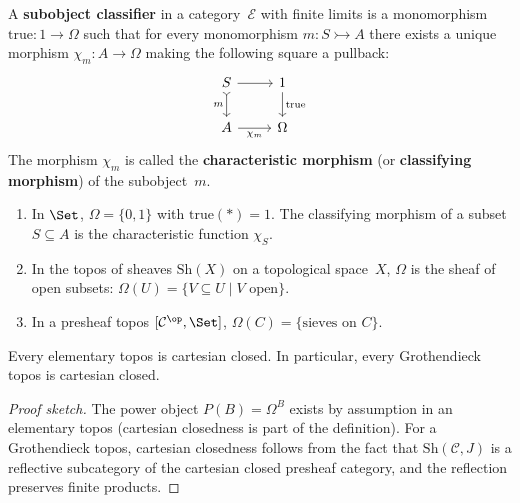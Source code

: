 \begin{definition}\label{def:subobject-classifier}
A \textbf{subobject classifier} in a category~$\mathcal{E}$ with
finite limits is a monomorphism $\mathrm{true}\colon 1\to\Omega$
such that for every monomorphism $m\colon S\rightarrowtail A$
there exists a unique morphism $\chi_m\colon A\to\Omega$ making the
following square a pullback:
\[
\begin{tikzcd}
S \arrow[r] \arrow[d, tail, "m"'] & 1 \arrow[d, "\mathrm{true}"] \\
A \arrow[r, "\chi_m"'] & \Omega
\end{tikzcd}
\]
The morphism $\chi_m$ is called the \textbf{characteristic morphism}
(or \textbf{classifying morphism}) of the subobject~$m$.
\end{definition}

\begin{example}\label{ex:subobject-classifier}
\begin{enumerate}[label=(\roman*)]
\item In $\Set$, $\Omega = \{0,1\}$ with $\mathrm{true}(*)=1$.
      The classifying morphism of a subset $S\subseteq A$ is
      the characteristic function $\chi_S$.
\item In the topos of sheaves $\mathrm{Sh}(X)$ on a topological
      space~$X$, $\Omega$ is the sheaf of open subsets:
      $\Omega(U) = \{V\subseteq U \mid V\text{ open}\}$.
\item In a presheaf topos $[\mathcal{C}^{\op}, \Set]$,
      $\Omega(C) = \{\text{sieves on } C\}$.
\end{enumerate}
\end{example}

\begin{theorem}\label{thm:topos-ccc}
Every elementary topos is cartesian closed.  In particular, every
Grothendieck topos is cartesian closed.
\end{theorem}

\begin{proof}[Proof sketch]
The power object $P(B) = \Omega^B$ exists by assumption in an elementary
topos (cartesian closedness is part of the definition).  For a
Grothendieck topos, cartesian closedness follows from the fact that
$\mathrm{Sh}(\mathcal{C},J)$ is a reflective subcategory of the
cartesian closed presheaf category, and the reflection preserves
finite products.
\end{proof}

